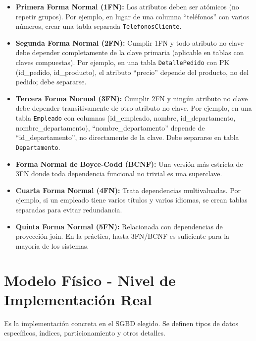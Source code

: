 \documentclass[12pt,a4paper,openany,oneside]{book}
\begin{document}
\begin{itemize}
    \item \textbf{Primera Forma Normal (1FN):} Los atributos deben ser atómicos (no repetir grupos). Por ejemplo, en lugar de una columna ``teléfonos'' con varios números, crear una tabla separada \texttt{TelefonosCliente}.
    \item \textbf{Segunda Forma Normal (2FN):} Cumplir 1FN y todo atributo no clave debe depender completamente de la clave primaria (aplicable en tablas con claves compuestas). Por ejemplo, en una tabla \texttt{DetallePedido} con PK (id\_pedido, id\_producto), el atributo ``precio'' depende del producto, no del pedido; debe separarse.
    \item \textbf{Tercera Forma Normal (3FN):} Cumplir 2FN y ningún atributo no clave debe depender transitivamente de otro atributo no clave. Por ejemplo, en una tabla \texttt{Empleado} con columnas (id\_empleado, nombre, id\_departamento, nombre\_departamento), ``nombre\_departamento'' depende de ``id\_departamento'', no directamente de la clave. Debe separarse en tabla \texttt{Departamento}.
    \item \textbf{Forma Normal de Boyce-Codd (BCNF):} Una versión más estricta de 3FN donde toda dependencia funcional no trivial es una superclave.
    \item \textbf{Cuarta Forma Normal (4FN):} Trata dependencias multivaluadas. Por ejemplo, si un empleado tiene varios títulos y varios idiomas, se crean tablas separadas para evitar redundancia.
    \item \textbf{Quinta Forma Normal (5FN):} Relacionada con dependencias de proyección-join. En la práctica, hasta 3FN/BCNF es suficiente para la mayoría de los sistemas.
\end{itemize}

\section{Modelo Físico - Nivel de Implementación Real}
Es la implementación concreta en el SGBD elegido. Se definen tipos de datos específicos, índices, particionamiento y otros detalles.
\end{document}
